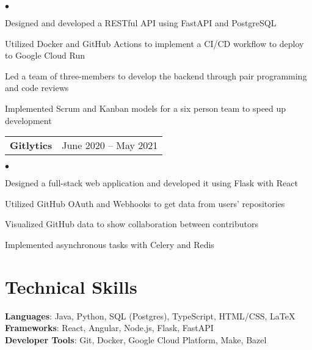 \documentclass[margin, 11pt]{res}
\makeatletter
\newcommand{\resumeSubSubheading}[2]{
\begin{tabular*}{1.01\textwidth}{@{\hspace{-4pt}}l @{\extracolsep{\fill}} r}
    #1 & #2 
\end{tabular*}\vspace{-7pt}
}
\newenvironment{list2}{
	\begin{list}{$\bullet$}{%
	    \small
		\setlength{\itemsep}{0in}
		\setlength{\parsep}{0in} \setlength{\parskip}{0in}
		\setlength{\topsep}{0in} \setlength{\partopsep}{0in}
		\setlength{\leftmargin}{0.2in}}}{\end{list}}
\makeatother
\begin{document}
\begin{resume}
\begin{list2}
\item{Designed and developed a RESTful API using FastAPI and PostgreSQL}
\item{Utilized Docker and GitHub Actions to implement a CI/CD workflow to deploy to Google Cloud Run}
\item{Led a team of three-members to develop the backend through pair programming and code reviews}
\item{Implemented Scrum and Kanban models for a six person team to speed up development}
\end{list2}

\resumeSubSubheading{\textbf{Gitlytics}}{June 2020 -- May 2021}

\begin{list2}
\item{Designed a full-stack web application and developed it using Flask with React}
\item{Utilized GitHub OAuth and Webhooks to get data from users' repositories}
\item{Visualized GitHub data to show collaboration between contributors}
\item{Implemented asynchronous tasks with Celery and Redis}
\end{list2}


\section{\sc Technical Skills}

\textbf{Languages}{: Java, Python, SQL (Postgres), TypeScript, HTML/CSS, \LaTeX} \\
\textbf{Frameworks}{: React, Angular, Node.js, Flask, FastAPI} \\
\textbf{Developer Tools}{: Git, Docker, Google Cloud Platform, Make, Bazel} \\


\vspace{0.2in}

\end{resume}
\end{document}
